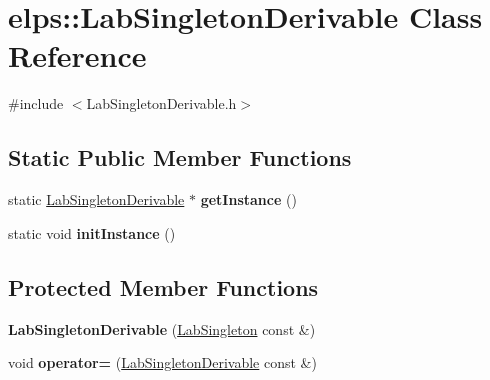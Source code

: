 \hypertarget{classelps_1_1_lab_singleton_derivable}{\section{elps\+:\+:Lab\+Singleton\+Derivable Class Reference}
\label{classelps_1_1_lab_singleton_derivable}
}


{\ttfamily \#include $<$Lab\+Singleton\+Derivable.\+h$>$}

\subsection*{Static Public Member Functions}
\begin{DoxyCompactItemize}
\item 
\hypertarget{classelps_1_1_lab_singleton_derivable_a925d9431de9d1036a0f552c97d41a4c9}{static \hyperlink{classelps_1_1_lab_singleton_derivable}{Lab\+Singleton\+Derivable} $\ast$ {\bfseries get\+Instance} ()}\label{classelps_1_1_lab_singleton_derivable_a925d9431de9d1036a0f552c97d41a4c9}

\item 
\hypertarget{classelps_1_1_lab_singleton_derivable_a4b919a0213df38476379a675b2ff0056}{static void {\bfseries init\+Instance} ()}\label{classelps_1_1_lab_singleton_derivable_a4b919a0213df38476379a675b2ff0056}

\end{DoxyCompactItemize}
\subsection*{Protected Member Functions}
\begin{DoxyCompactItemize}
\item 
\hypertarget{classelps_1_1_lab_singleton_derivable_a52a3fb806b44292eeb6d75d7be28399f}{{\bfseries Lab\+Singleton\+Derivable} (\hyperlink{classelps_1_1_lab_singleton}{Lab\+Singleton} const \&)}\label{classelps_1_1_lab_singleton_derivable_a52a3fb806b44292eeb6d75d7be28399f}

\item 
\hypertarget{classelps_1_1_lab_singleton_derivable_a7145cb20c1d789633f52f2692b8e6e77}{void {\bfseries operator=} (\hyperlink{classelps_1_1_lab_singleton_derivable}{Lab\+Singleton\+Derivable} const \&)}\label{classelps_1_1_lab_singleton_derivable_a7145cb20c1d789633f52f2692b8e6e77}

\end{DoxyCompactItemize}


